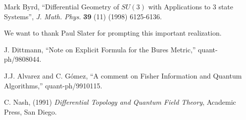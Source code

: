 \documentclass[titlepage,12pt]{utarticle}
\begin{document}
\begin{thebibliography}{99}


Mark Byrd, 
 ``Differential Geometry of $SU(3)$ with Applications to 3 state Systems'', 
{\it J. Math. Phys.} {\bf 39} (11) (1998) 6125-6136.

We want to thank Paul Slater for prompting this important 
realization.

J. Dittmann, ``Note on Explicit Formula for the Bures Metric,'' quant-ph/9808044.

J.J. Alvarez and C. G\'omez, ``A comment on Fisher Information and Quantum
Algorithms,'' quant-ph/9910115.

C. Nash, (1991) {\it Differential Topology and Quantum Field Theory}, 
Academic Press, San Diego.

\end{thebibliography}

\end{document}
